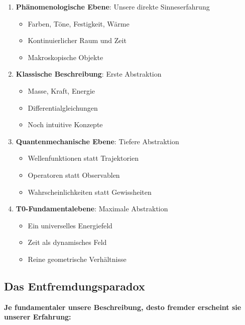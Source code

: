 	\begin{tcolorbox}[colback=orange!5!white,colframe=orange!75!black,title=Ontologische Schichtung der Realität]
		\begin{enumerate}
			\item \textbf{Phänomenologische Ebene}: Unsere direkte Sinneserfahrung
			\begin{itemize}
				\item Farben, Töne, Festigkeit, Wärme
				\item Kontinuierlicher Raum und Zeit
				\item Makroskopische Objekte
			\end{itemize}
			
			\item \textbf{Klassische Beschreibung}: Erste Abstraktion
			\begin{itemize}
				\item Masse, Kraft, Energie
				\item Differentialgleichungen
				\item Noch intuitive Konzepte
			\end{itemize}
			
			\item \textbf{Quantenmechanische Ebene}: Tiefere Abstraktion
			\begin{itemize}
				\item Wellenfunktionen statt Trajektorien
				\item Operatoren statt Observablen
				\item Wahrscheinlichkeiten statt Gewissheiten
			\end{itemize}
			
			\item \textbf{T0-Fundamentalebene}: Maximale Abstraktion
			\begin{itemize}
				\item Ein universelles Energiefeld
				\item Zeit als dynamisches Feld
				\item Reine geometrische Verhältnisse
			\end{itemize}
		\end{enumerate}
	\end{tcolorbox}
	
	\subsection{Das Entfremdungsparadox}
	
	\textbf{Je fundamentaler unsere Beschreibung, desto fremder erscheint sie unserer Erfahrung:}
	
